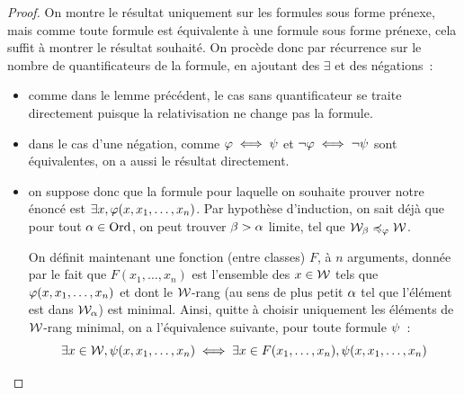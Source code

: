 \begin{proof}
  On montre le résultat uniquement sur les formules sous forme prénexe, mais
  comme toute formule est équivalente à une formule sous forme prénexe, cela
  suffit à montrer le résultat souhaité. On procède donc par récurrence sur
  le nombre de quantificateurs de la formule, en ajoutant des $\exists$ et des
  négations~:
  \begin{itemize}
  \item comme dans le lemme précédent, le cas sans quantificateur se traite
    directement puisque la relativisation ne change pas la formule.
  \item dans le cas d'une négation, comme $\varphi \iff \psi$ et
    $\lnot\varphi\iff\lnot\psi$ sont équivalentes, on a aussi le résultat
    directement.
  \item on suppose donc que la formule pour laquelle on souhaite prouver notre
    énoncé est $\exists x, \varphi(x,x_1,\ldots,x_n)$. Par hypothèse
    d'induction, on sait déjà que pour tout $\alpha \in \operatorname{Ord}$, on peut trouver
    $\beta > \alpha$ limite, tel que $\mathcal{W}_\beta \preccurlyeq_{\varphi} \mathcal{W}$.

    On définit maintenant une fonction (entre classes) $F$, à $n$ arguments,
    donnée par le fait que $F(x_1,\ldots,x_n)$ est l'ensemble des
    $x \in \mathcal{W}$ tels que $\varphi(x,x_1,\ldots,x_n)$ et dont le
    $\mathcal{W}$-rang (au sens de plus petit $\alpha$ tel que l'élément est dans
    $\mathcal{W}_\alpha$) est minimal. Ainsi, quitte à choisir uniquement les éléments
    de $\mathcal{W}$-rang minimal, on a l'équivalence suivante, pour toute formule
    $\psi$~:
    \[\exists x \in \mathcal{W}, \psi(x,x_1,\ldots,x_n) \iff
    \exists x \in F(x_1,\ldots,x_n), \psi(x,x_1,\ldots,x_n)\]


\end{itemize}
\end{proof}
